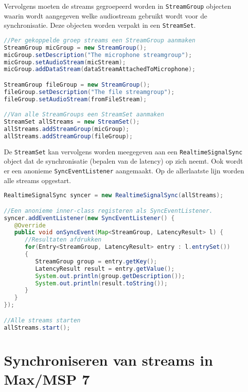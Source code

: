 Vervolgens moeten de streams gegroepeerd worden in \texttt{StreamGroup} objecten waarin wordt aangegeven welke audiostream gebruikt wordt voor de synchronisatie. Deze objecten worden verpakt in een \texttt{StreamSet}.

\begin{lstlisting}[language=java, frame=single]
//Per gekoppelde groep streams een StreamGroup aanmaken
StreamGroup micGroup = new StreamGroup();
micGroup.setDescription("The microphone streamgroup");
micGroup.setAudioStream(micStream);
micGroup.addDataStream(dataStreamAttachedToMicrophone);

StreamGroup fileGroup = new StreamGroup();
fileGroup.setDescription("The file streamgroup");
fileGroup.setAudioStream(fromFileStream);

//Van alle StreamGroups een StreamSet aanmaken
StreamSet allStreams = new StreamSet();
allStreams.addStreamGroup(micGroup);
allStreams.addStreamGroup(fileGroup);
\end{lstlisting}

De \texttt{StreamSet} kan vervolgens worden meegegeven aan een \texttt{RealtimeSignalSync} object dat de synchronisatie (bepalen van de latency) op zich neemt. Ook wordt er een anonieme \texttt{SyncEventListener} aangemaakt. Op de allerlaatste lijn worden alle streams opgestart.

\begin{lstlisting}[language=java, frame=single]
RealtimeSignalSync syncer = new RealtimeSignalSync(allStreams);

//Een anonieme inner-class registeren als SyncEventListener.
syncer.addEventListener(new SyncEventListener() {
   @Override
   public void onSyncEvent(Map<StreamGroup, LatencyResult> l) {
      //Resultaten afdrukken
      for(Entry<StreamGroup, LatencyResult> entry : l.entrySet()) 
      {
         StreamGroup group = entry.getKey();
         LatencyResult result = entry.getValue();
         System.out.println(group.getDescription());
         System.out.println(result.toString());
      }
   }
});

//Alle streams starten
allStreams.start();
\end{lstlisting}

\section*{Synchroniseren van streams in Max/MSP 7}

